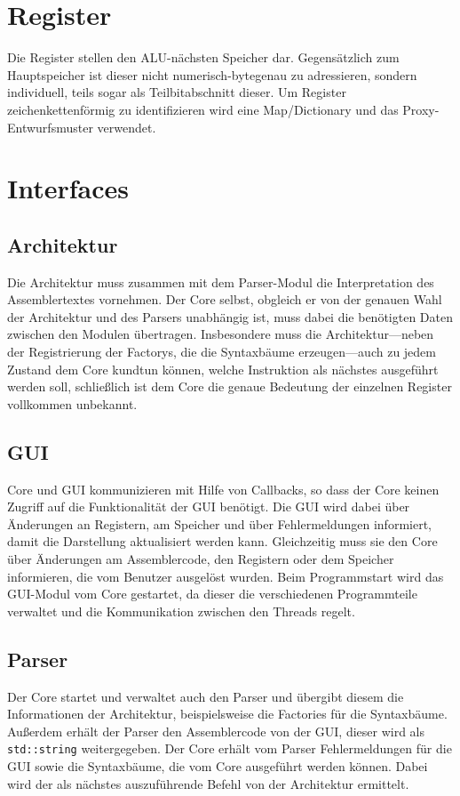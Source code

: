 \section{Register}
Die Register stellen den ALU-nächsten Speicher dar. Gegensätzlich zum Hauptspeicher ist dieser nicht numerisch-bytegenau zu adressieren, sondern individuell, teils sogar als Teilbitabschnitt dieser.  Um Register zeichenkettenförmig zu identifizieren wird eine Map/Dictionary und das Proxy-Entwurfsmuster verwendet.

\section{Interfaces}

\subsection{Architektur}
Die Architektur muss zusammen mit dem Parser-Modul die Interpretation des Assemblertextes vornehmen. Der Core selbst, obgleich er von der genauen Wahl der Architektur und des Parsers unabhängig ist, muss dabei die benötigten Daten zwischen den Modulen übertragen. Insbesondere muss die Architektur---neben der Registrierung der Factorys, die die Syntaxbäume erzeugen---auch zu jedem Zustand dem Core kundtun können, welche Instruktion als nächstes ausgeführt werden soll, schließlich ist dem Core die genaue Bedeutung der einzelnen Register vollkommen unbekannt.

\subsection{GUI}

Core und GUI kommunizieren mit Hilfe von Callbacks, so dass der Core keinen Zugriff auf die Funktionalität der GUI benötigt. Die GUI wird dabei über Änderungen an Registern, am Speicher und über Fehlermeldungen informiert, damit die Darstellung aktualisiert werden kann. Gleichzeitig muss sie den Core über Änderungen am Assemblercode, den Registern oder dem Speicher informieren, die vom Benutzer ausgelöst wurden. Beim Programmstart wird das GUI-Modul vom Core gestartet, da dieser die verschiedenen Programmteile verwaltet und die Kommunikation zwischen den Threads regelt.

\subsection{Parser}

Der Core startet und verwaltet auch den Parser und übergibt diesem die Informationen der Architektur, beispielsweise die Factories für die Syntaxbäume. Au{\ss}erdem erhält der Parser den Assemblercode von der GUI, dieser wird als \lstinline[style=C++]!std::string! weitergegeben. Der Core erhält vom Parser Fehlermeldungen für die GUI sowie die Syntaxbäume, die vom Core ausgeführt werden können. Dabei wird der als nächstes auszuführende Befehl von der Architektur ermittelt.

